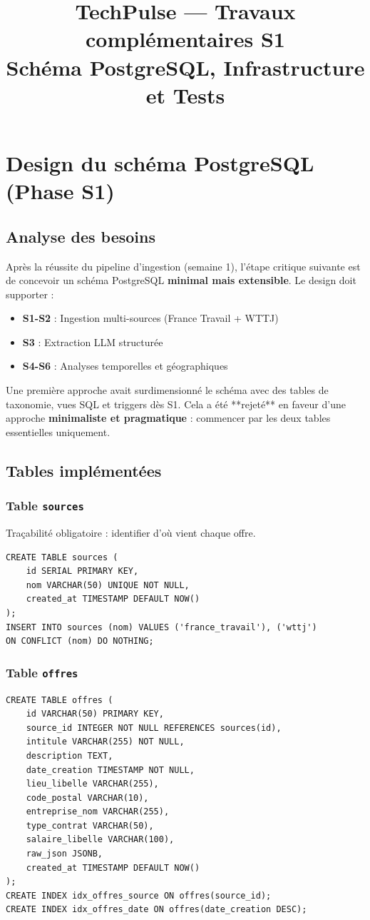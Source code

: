 \documentclass[12pt, a4paper]{article}
\title{
    \vspace{-1cm}
    \textbf{\Large TechPulse — Travaux complémentaires S1} \\
    \vspace{0.4cm}
    \large Schéma PostgreSQL, Infrastructure et Tests \\
    \vspace{0.3cm}
}
\author{}
\date{}
\begin{document}
\maketitle
\thispagestyle{fancy}
\section{Design du schéma PostgreSQL (Phase S1)}
\subsection{Analyse des besoins}
Après la réussite du pipeline d'ingestion (semaine 1), l'étape critique suivante est de concevoir un schéma PostgreSQL \textbf{minimal mais extensible}. Le design doit supporter :
\begin{itemize}
    \item \textbf{S1-S2} : Ingestion multi-sources (France Travail + WTTJ)
    \item \textbf{S3} : Extraction LLM structurée
    \item \textbf{S4-S6} : Analyses temporelles et géographiques
\end{itemize}
Une première approche avait surdimensionné le schéma avec des tables de taxonomie, vues SQL et triggers dès S1. Cela a été **rejeté** en faveur d'une approche \textbf{minimaliste et pragmatique} : commencer par les deux tables essentielles uniquement.
\subsection{Tables implémentées}
\subsubsection{Table \texttt{sources}}
Traçabilité obligatoire : identifier d'où vient chaque offre.
\begin{lstlisting}[style=sql]
CREATE TABLE sources (
    id SERIAL PRIMARY KEY,
    nom VARCHAR(50) UNIQUE NOT NULL,
    created_at TIMESTAMP DEFAULT NOW()
);
INSERT INTO sources (nom) VALUES ('france_travail'), ('wttj')
ON CONFLICT (nom) DO NOTHING;
\end{lstlisting}
\subsubsection{Table \texttt{offres}}
\begin{lstlisting}[style=sql]
CREATE TABLE offres (
    id VARCHAR(50) PRIMARY KEY,
    source_id INTEGER NOT NULL REFERENCES sources(id),
    intitule VARCHAR(255) NOT NULL,
    description TEXT,
    date_creation TIMESTAMP NOT NULL,
    lieu_libelle VARCHAR(255),
    code_postal VARCHAR(10),
    entreprise_nom VARCHAR(255),
    type_contrat VARCHAR(50),
    salaire_libelle VARCHAR(100),
    raw_json JSONB,
    created_at TIMESTAMP DEFAULT NOW()
);
CREATE INDEX idx_offres_source ON offres(source_id);
CREATE INDEX idx_offres_date ON offres(date_creation DESC);
\end{lstlisting}
\end{document}
